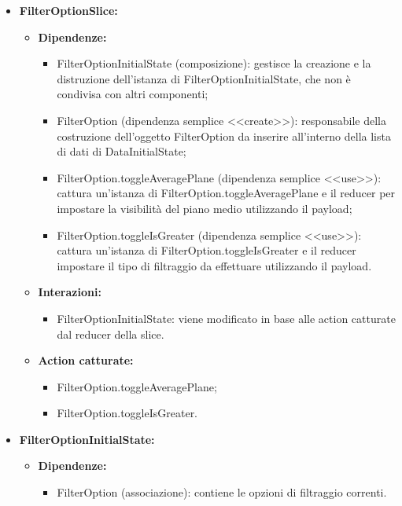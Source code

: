 \begin{itemize}
    \item \textbf{FilterOptionSlice:}
    \begin{itemize}
        \item \textbf{Dipendenze:}
        \begin{itemize}
            \item FilterOptionInitialState (composizione): gestisce la creazione e la distruzione dell'istanza di FilterOptionInitialState, che non è condivisa con altri componenti;
            \item FilterOption (dipendenza semplice <<create>>): responsabile della costruzione dell'oggetto FilterOption da inserire all’interno della lista di dati di DataInitialState;
            \item FilterOption.toggleAveragePlane (dipendenza semplice <<use>>): cattura un’istanza di FilterOption.toggleAveragePlane e il reducer per impostare la visibilità del piano medio utilizzando il payload;
            \item FilterOption.toggleIsGreater (dipendenza semplice <<use>>): cattura un’istanza di FilterOption.toggleIsGreater e il reducer impostare il tipo di filtraggio da effettuare utilizzando il payload.
        \end{itemize} 
        \item \textbf{Interazioni:}
        \begin{itemize}
            \item FilterOptionInitialState: viene modificato in base alle action catturate dal reducer della slice.
        \end{itemize} 
        \item \textbf{Action catturate:}
        \begin{itemize}
            \item FilterOption.toggleAveragePlane;
            \item FilterOption.toggleIsGreater.
        \end{itemize} 
    \end{itemize}

    \item \textbf{FilterOptionInitialState:}
    \begin{itemize}
        \item \textbf{Dipendenze:}
        \begin{itemize}
            \item FilterOption (associazione): contiene le opzioni di filtraggio correnti.
        \end{itemize} 
    \end{itemize}


\end{itemize}

